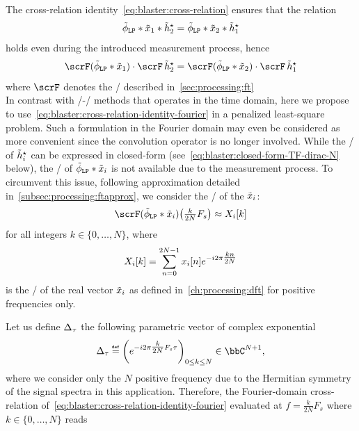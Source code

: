 The cross-relation identity~\cref{eq:blaster:cross-relation} ensures that the relation
\begin{equation}
    \idealLowPassFilter
    \ast \contRecordedSignal_1
    \ast  \contFilter_2^\star
    =
    \idealLowPassFilter
    \ast \contRecordedSignal_2
    \ast  \contFilter_1^\star
\end{equation}
holds even during the introduced measurement process, hence
\begin{equation}
    \label{eq:blaster:cross-relation-identity-fourier}
    \fourierTrans(\idealLowPassFilter\ast\contRecordedSignal_1) \cdot \fourierTrans \contFilter_2^\star
    =
    \fourierTrans(\idealLowPassFilter\ast\contRecordedSignal_2) \cdot \fourierTrans \contFilter_1^\star
\end{equation}
where $\fourierTrans$ denotes the \FTdef/ described in~\cref{sec:processing:ft}
\\In contrast with \SIMO/-\BCE/ methods that operates in the time domain, here we propose to use~\cref{eq:blaster:cross-relation-identity-fourier} in a penalized least-square problem.
Such a formulation in the Fourier domain may even be considered as more convenient since the convolution operator is no longer involved.
While the \FT/ of $\tilde{h}_i^\star$ can be expressed in closed-form (see~\cref{eq:blaster:closed-form-TF-dirac-N} below), the \FT/ of $\idealLowPassFilter\ast\contRecordedSignal_i$ is not available due to the measurement process.
To circumvent this issue, following approximation detailed in~\cref{subsec:processing:ftapprox}, we consider the \DFTdef/ of the $\tilde{x}_i$:
\begin{equation}
    \label{eq:blaster:approx-TF}
    \fourierTrans(\idealLowPassFilter\ast\contRecordedSignal_i)
    \kparen{\tfrac{k}{2N}F_s}
    \approx
    X_i[k]
\end{equation}
for all integers  $k \in \{0, \ldots, N\}$, where
\begin{equation}
    \label{eq:blaster:dft-Xi}
    X_i[k] = \sum_{n=0}^{2N-1}
    x_i[n]
    {e}^{-{i}2\pi \tfrac{kn}{2N}}
\end{equation}
is the \DFT/ of the real vector $\tilde{x}_i$ as defined in~\cref{ch:processing:dft} for positive frequencies only.

\mynewline
Let us define $\Delta_{\tau}$ the following parametric vector of complex exponential
\begin{equation}
    \label{eq:blaster:closed-form-TF-dirac-N}
    \paramVec{\tau} \eqdef
    \left(\cste^{-\csti2\pi\tfrac{k}{2N}F_s \tau}\right)_{0 \leq k \leq N}
    \in\bbC^{N+1}
    ,
\end{equation}
where we consider only the $N$ positive frequency due to the Hermitian symmetry of the signal spectra in this application.
Therefore, the Fourier-domain cross-relation of~\cref{eq:blaster:cross-relation-identity-fourier} evaluated at $f = \frac{k}{2N}F_s$ where $k \in \{0,\ldots, N\}$
reads

